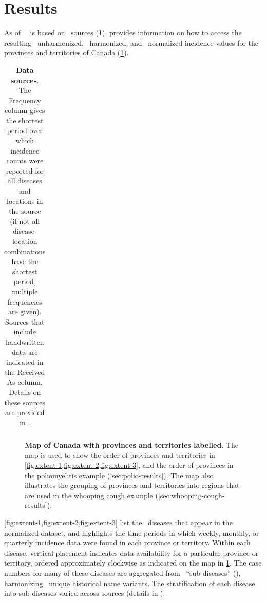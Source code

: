 \documentclass[12pt]{article}
\begin{document}
\section{Results}\label{sec:results}

As of \asofnow\ \datacronym\ is based on \ sources (\cref{tab:sources-table}).  provides information on how to access the resulting \ unharmonized, \ harmonized, and \ normalized incidence values for the provinces and territories of Canada (\cref{fig:map}).

\begin{table}[!htb]
  \centering
  \caption{\textbf{Data sources}. The Frequency column gives the shortest period over which incidence counts were reported for all diseases and locations in the source (if not all disease-location combinations have the shortest period, multiple frequencies are given). Sources that include handwritten data are indicated in the Received As column. Details on these sources are provided in .} 
  \begin{tabular}{ll>{\raggedright\arraybackslash}p{0.11\linewidth}>{\raggedright\arraybackslash}p{0.25\linewidth}>{\raggedright\arraybackslash}p{0.2\linewidth}}  

\end{tabular}
\label{tab:sources-table}
\end{table}

\begin{figure}[!htb]
\caption{\textbf{Map of Canada with provinces and territories labelled}. The map is used to show the order of provinces and territories in \cref{fig:extent-1,fig:extent-2,fig:extent-3}, and the order of provinces in the poliomyelitis example (\cref{sec:polio-results}). The map also illustrates the grouping of provinces and territories into regions that are used in the whooping cough example (\cref{sec:whooping-cough-results}).}\label{fig:map}
\end{figure}

\newpage 

\cref{fig:extent-1,fig:extent-2,fig:extent-3} list the \ diseases that appear in the normalized dataset, and highlights the time periods in which weekly, monthly, or quarterly incidence data were found in each province or territory. Within each disease, vertical placement indicates data availability for a particular province or territory, ordered approximately clockwise as indicated on the map in \cref{fig:map}. The case numbers for many of these diseases are aggregated from \ ``sub-diseases'' (), harmonizing \ unique historical name variants. The stratification of each disease into sub-diseases varied across sources (details in ).
\end{document}
